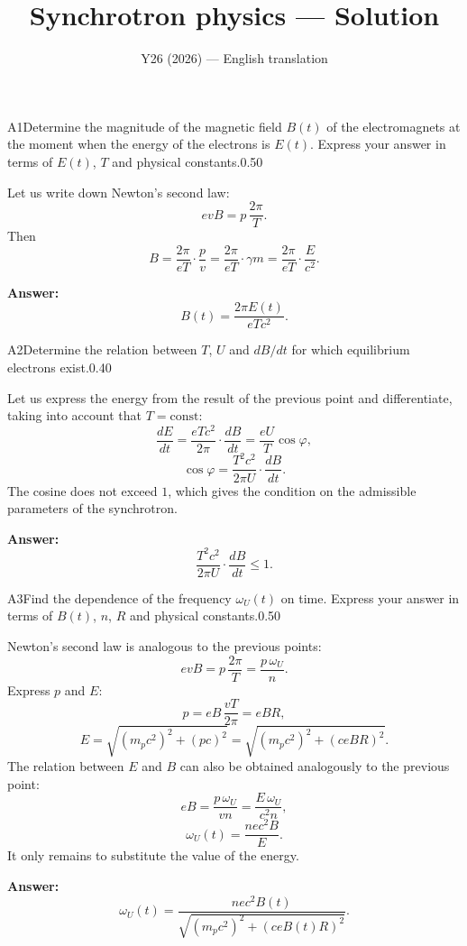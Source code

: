 \documentclass[11pt,a4paper]{article}
\title{\textbf{Synchrotron physics --- Solution}}
\author{\normalsize Y26 (2026) --- English translation}
\date{}
\begin{document}
\maketitle\vspace{-0.5em}

\begin{solcard}{A1}{Determine the magnitude of the magnetic field $B(t)$ of the electromagnets at the moment when the energy of the electrons is $E(t)$. Express your answer in terms of $E(t)$, $T$ and physical constants.}{0.50}

Let us write down Newton's second law: $$e v B = p\,\frac{2\pi}{T}.$$ Then $$B = \frac{2\pi}{eT}\cdot\frac{p}{v} = \frac{2\pi}{eT}\cdot\gamma m = \frac{2\pi}{eT}\cdot\frac{E}{c^2}.$$

\par\smallskip\noindent\textbf{Answer:} $$B(t) = \frac{2\pi E(t)}{eT c^2}.$$
\end{solcard}

\begin{solcard}{A2}{Determine the relation between $T$, $U$ and $dB/dt$ for which equilibrium electrons exist.}{0.40}

Let us express the energy from the result of the previous point and differentiate, taking into account that $T = \text{const}$: $$\frac{dE}{dt} = \frac{eTc^2}{2\pi}\cdot\frac{dB}{dt} = \frac{eU}{T}\cos\varphi,$$ $$\cos\varphi = \frac{T^2c^2}{2\pi U}\cdot\frac{dB}{dt}.$$ The cosine does not exceed $1$, which gives the condition on the admissible parameters of the synchrotron.

\par\smallskip\noindent\textbf{Answer:} $$\frac{T^2c^2}{2\pi U}\cdot\frac{dB}{dt} \leqslant 1.$$
\end{solcard}

\begin{solcard}{A3}{Find the dependence of the frequency $\omega_U(t)$ on time. Express your answer in terms of $B(t)$, $n$, $R$ and physical constants.}{0.50}

Newton's second law is analogous to the previous points: $$e v B = p\,\frac{2\pi}{T} = \frac{p\,\omega_U}{n}.$$ Express $p$ and $E$: $$p = eB\,\frac{vT}{2\pi} = eBR,$$ $$E = \sqrt{(m_p c^2)^2 + (pc)^2} = \sqrt{(m_p c^2)^2 + (ceBR)^2}.$$ The relation between $E$ and $B$ can also be obtained analogously to the previous point: $$eB = \frac{p\,\omega_U}{vn} = \frac{E\,\omega_U}{c^2 n},$$ $$\omega_U(t) = \frac{nec^2 B}{E}.$$ It only remains to substitute the value of the energy.

\par\smallskip\noindent\textbf{Answer:} $$\omega_U(t) = \frac{nec^2 B(t)}{\sqrt{(m_p c^2)^2 + \left(ceB(t)R\right)^2}}.$$
\end{solcard}
\end{document}

